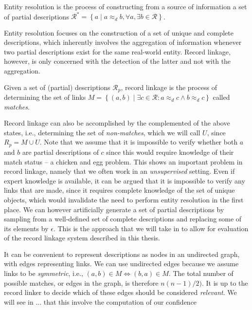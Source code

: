 \begin{definition}
    Entity resolution is the process of constructing from a source of information a set of partial descriptions $\mathcal{R}^{*} = \left\{ a \mid a \approx_{d} b, \forall{a}, \exists{b} \in \mathcal{R} \right\}$.
\end{definition}

\noindent Entity resolution focuses on the construction of a set of unique and complete descriptions, which inherently involves the aggregation of information whenever two partial descriptions exist for the same real-world entity.
Record linkage, however, is only concerned with the detection of the latter and not with the aggregation.

\begin{definition}
    Given a set of (partial) descriptions $\mathcal{R}_{p}$, record linkage is the process of determining the set of links $M = \left\{ (a, b) \mid \exists{c} \in \mathcal{R}: a \approx_{d} c \wedge b \approx_{d} c \right\}$ called \emph{matches}.
\end{definition}

Record linkage can also be accomplished by the complemented of the above states, i.e., determining the set of \emph{non-matches}, which we will call $U$, since $R_{p} = M \cup U$.
Note that we assume that it is impossible to verify whether both $a$ and $b$ are partial descriptions of $c$ since this would require knowledge of their match status -- a chicken and egg problem.
This shows an important problem in record linkage, namely that we often work in an \emph{unsupervised} setting.
Even if expert knowledge is available, it can be argued that it is impossible to verify any links that are made, since it requires complete knowledge of the set of unique objects, which would invalidate the need to perform entity resolution in the first place.
We can however artificially generate a set of partial descriptions by sampling from a well-defined set of complete descriptions and replacing some of its elements by $\epsilon$.
This is the approach that we will take in  to allow for evaluation of the record linkage system described in this thesis.

It can be convenient to represent descriptions as nodes in an undirected graph, with edges representing links.
We can use undirected edges because we assume links to be \emph{symmetric}, i.e., $(a, b) \in M \Leftrightarrow (b, a) \in M$.
The total number of possible matches, or edges in the graph, is therefore $n(n-1)/2)$.
It is up to the record linker to decide which of these edges should be considered \emph{relevant}.
We will see in ...  that this involve the computation of our confidence 

